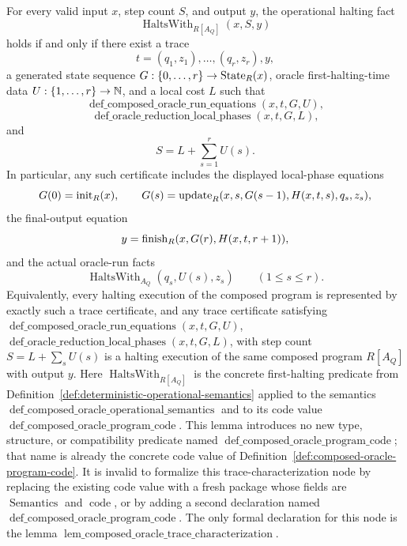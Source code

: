 \begin{lemma}
  \label{lem:composed-oracle-trace-characterization}
  For every valid input $x$, step count $S$, and output $y$, the operational
  halting fact
  \[
    \operatorname{HaltsWith}_{R[A_Q]}(x,S,y)
  \]
  holds if and only if there exist a trace
  \[
    t=(q_1,z_1),\ldots,(q_r,z_r),y,
  \]
  a generated state sequence $G:\{0,\ldots,r\}\to\operatorname{State}_R(x)$, oracle
  first-halting-time data $U:\{1,\ldots,r\}\to\mathbb{N}$, and a local cost $L$ such
  that
  \[
    \operatorname{def\_composed\_oracle\_run\_equations}(x,t,G,U),
  \]
  \[
    \operatorname{def\_oracle\_reduction\_local\_phases}(x,t,G,L),
  \]
  and
  \[
    S=L+\sum_{s=1}^{r}U(s).
  \]
  In particular, any such certificate includes the displayed local-phase
  equations
  \[
    G(0)=\operatorname{init}_R(x),\qquad
    G(s)=\operatorname{update}_R(x,s,G(s-1),H(x,t,s),q_s,z_s),
  \]
  the final-output equation
  \[
    y=\operatorname{finish}_R(x,G(r),H(x,t,r+1)),
  \]
  and the actual oracle-run facts
  \[
    \operatorname{HaltsWith}_{A_Q}(q_s,U(s),z_s)
    \qquad(1\leq s\leq r).
  \]
  Equivalently, every halting execution of the composed program is represented
  by exactly such a trace certificate, and any trace certificate satisfying
  $\operatorname{def\_composed\_oracle\_run\_equations}(x,t,G,U)$,
  $\operatorname{def\_oracle\_reduction\_local\_phases}(x,t,G,L)$, with
  step count $S=L+\sum_s U(s)$ is a halting execution of the same composed
  program $R[A_Q]$ with output $y$.
  Here $\operatorname{HaltsWith}_{R[A_Q]}$ is the concrete first-halting
  predicate from Definition~\ref{def:deterministic-operational-semantics}
  applied to the semantics
  $\operatorname{def\_composed\_oracle\_operational\_semantics}$ and to its
  code value
  $\operatorname{def\_composed\_oracle\_program\_code}$.  This lemma introduces
  no new type, structure, or compatibility predicate named
  $\operatorname{def\_composed\_oracle\_program\_code}$; that name is already
  the concrete code value of Definition~\ref{def:composed-oracle-program-code}.
  It is invalid to formalize this trace-characterization node by replacing
  the existing code value with a fresh package whose fields are
  $\operatorname{Semantics}$ and $\operatorname{code}$, or by adding a second
  declaration named $\operatorname{def\_composed\_oracle\_program\_code}$.
  The only formal declaration for this node is the lemma
  $\operatorname{lem\_composed\_oracle\_trace\_characterization}$.
\end{lemma}
